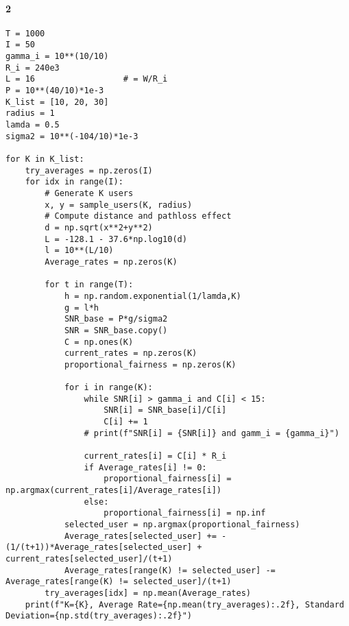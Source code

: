 \documentclass[a4paper,11pt,2]{article}
\begin{document}
\paragraph{2}
\begin{center}
\begin{lstlisting}
T = 1000
I = 50
gamma_i = 10**(10/10)
R_i = 240e3
L = 16                  # = W/R_i
P = 10**(40/10)*1e-3
K_list = [10, 20, 30]
radius = 1
lamda = 0.5
sigma2 = 10**(-104/10)*1e-3

for K in K_list:
    try_averages = np.zeros(I)
    for idx in range(I):
        # Generate K users
        x, y = sample_users(K, radius)
        # Compute distance and pathloss effect
        d = np.sqrt(x**2+y**2)
        L = -128.1 - 37.6*np.log10(d)
        l = 10**(L/10)
        Average_rates = np.zeros(K)

        for t in range(T):
            h = np.random.exponential(1/lamda,K)
            g = l*h
            SNR_base = P*g/sigma2
            SNR = SNR_base.copy()
            C = np.ones(K)
            current_rates = np.zeros(K)
            proportional_fairness = np.zeros(K)

            for i in range(K):
                while SNR[i] > gamma_i and C[i] < 15:
                    SNR[i] = SNR_base[i]/C[i]
                    C[i] += 1
                # print(f"SNR[i] = {SNR[i]} and gamm_i = {gamma_i}")

                current_rates[i] = C[i] * R_i
                if Average_rates[i] != 0:
                    proportional_fairness[i] = np.argmax(current_rates[i]/Average_rates[i])
                else:
                    proportional_fairness[i] = np.inf
            selected_user = np.argmax(proportional_fairness)
            Average_rates[selected_user] += -(1/(t+1))*Average_rates[selected_user] + current_rates[selected_user]/(t+1)
            Average_rates[range(K) != selected_user] -= Average_rates[range(K) != selected_user]/(t+1)
        try_averages[idx] = np.mean(Average_rates)
    print(f"K={K}, Average Rate={np.mean(try_averages):.2f}, Standard Deviation={np.std(try_averages):.2f}")
\end{lstlisting}
\end{center}
\end{document}
